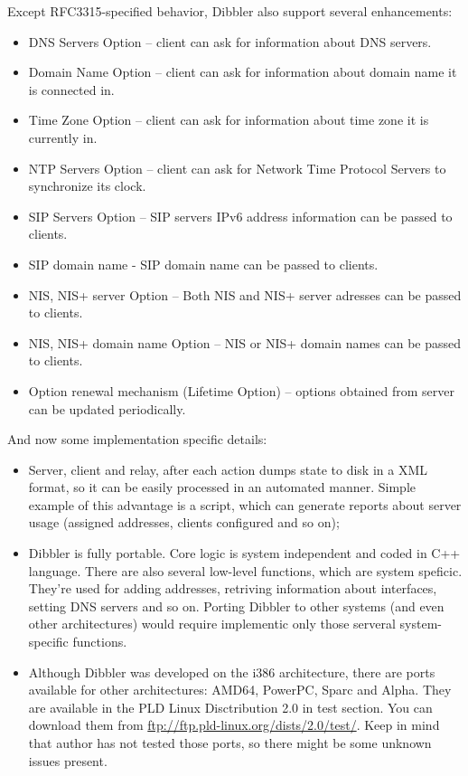 Except RFC3315-specified behavior, Dibbler also support several enhancements:

\begin{itemize}
\item DNS Servers Option -- client can ask for information about DNS
  servers.
\item Domain Name Option -- client can ask for information about
  domain name it is connected in.
\item Time Zone Option -- client can ask for information about 
time zone it is currently in.
\item NTP Servers Option -- client can ask for Network Time Protocol
  Servers to synchronize its clock.
\item SIP Servers Option -- SIP servers IPv6 address information can
  be passed to clients.
\item SIP domain name - SIP domain name can be passed to clients.
\item NIS, NIS+ server Option -- Both NIS and NIS+ server adresses
  can be passed to clients.
\item NIS, NIS+ domain name Option -- NIS or NIS+ domain names can be
  passed to clients.
\item Option renewal mechanism (Lifetime Option) -- options obtained
  from server can be updated periodically.
\end{itemize}

And now some implementation specific details:
\begin{itemize}
\item Server, client and relay, after each action dumps state to disk
  in a XML format, so it can be easily processed in an automated
  manner. Simple example of this advantage is a script, which can generate
  reports about server usage (assigned addresses, clients configured
  and so on);
\item Dibbler is fully portable. Core logic is system independent and
  coded in C++ language. There are also several low-level functions,
  which are system speficic. They're used for adding addresses,
  retriving information about interfaces, setting DNS servers and so
  on. Porting Dibbler to other systems (and even other architectures)
  would require implementic only those serveral system-specific
  functions.
\item Although Dibbler was developed on the i386 architecture, there
  are ports available for other architectures: AMD64, PowerPC, Sparc and
  Alpha. They are available in the PLD Linux Disctribution 2.0 in test
  section. You can download them from
  \url{ftp://ftp.pld-linux.org/dists/2.0/test/}. Keep in mind that author
  has not tested those ports, so there might be some unknown issues
  present.
\end{itemize}

